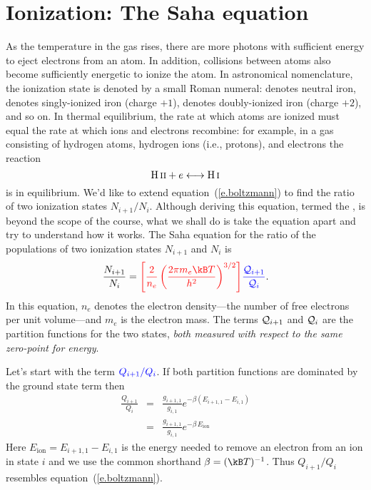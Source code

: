 \section{Ionization: The Saha equation}
\label{s.saha-eqn}

As the temperature in the gas rises, there are more photons with sufficient energy to eject electrons from an atom. In addition, collisions between atoms also become sufficiently energetic to ionize the atom. In astronomical nomenclature, the ionization state is denoted by a small Roman numeral:  denotes neutral iron,  denotes singly-ionized iron (charge $+1$),  denotes doubly-ionized iron (charge $+2$), and so on. In thermal equilibrium, the rate at which atoms are ionized must equal the rate at which ions and electrons recombine: for example, in a gas consisting of hydrogen atoms, hydrogen ions (i.e., protons), and electrons the reaction
\[
	\mathrm{H}\,\textrm{\scshape ii} + e \longleftrightarrow \mathrm{H}\,\textrm{\scshape i}
\]
is in equilibrium. We'd like to extend equation~(\ref{e.boltzmann}) to find the ratio of two ionization states $N_{i+1}/N_{i}$. Although deriving this equation, termed the , is beyond the scope of the course, what we shall do is take the equation apart and try to understand how it works.  The Saha equation for the ratio of the populations of two ionization states
$N_{i+1}$ and $N_{i}$ is
\begin{equation}\label{e.saha}
\frac{N_{i+1}}{N_{i}} 
= {\color{red}\left[\frac{2}{n_{e}}
\left(\frac{2\pi m_{e}\kB T}{h^{2}}\right)^{3/2}\right]}
{\color{blue}\frac{\pfcn_{i+1}}{\pfcn_{i}}}.
\end{equation}
In this equation, $n_{e}$ denotes the electron density---the number of free electrons per unit volume---and $m_{e}$ is the electron mass. The terms $\mathcal{Q}_{i+1}$ and $\mathcal{Q}_{i}$ are the partition functions for the two states, \emph{both measured with respect to the same zero-point for energy}.

Let's start with the term $\color{blue} Q_{i+1}/Q_{i}$. If both partition functions are dominated by the ground state term then
\begin{eqnarray*}
	\frac{Q_{i+1}}{Q_{i}} &=& \frac{g_{i+1,1}}{g_{i,1}} e^{-\beta (E_{i+1,1}-E_{i,1})}\\
	&=& \frac{g_{i+1,1}}{g_{i,1}} e^{-\beta\,E_{\mathrm{ion}}}
\end{eqnarray*}
Here $E_{\mathrm{ion}} = E_{i+1,1} - E_{i,1}$ is the energy needed to remove an electron from an ion in state $i$ and we use the common shorthand $\beta = (\kB T)^{-1}$. Thus $Q_{i+1}/Q_{i}$ resembles equation~(\ref{e.boltzmann}).

